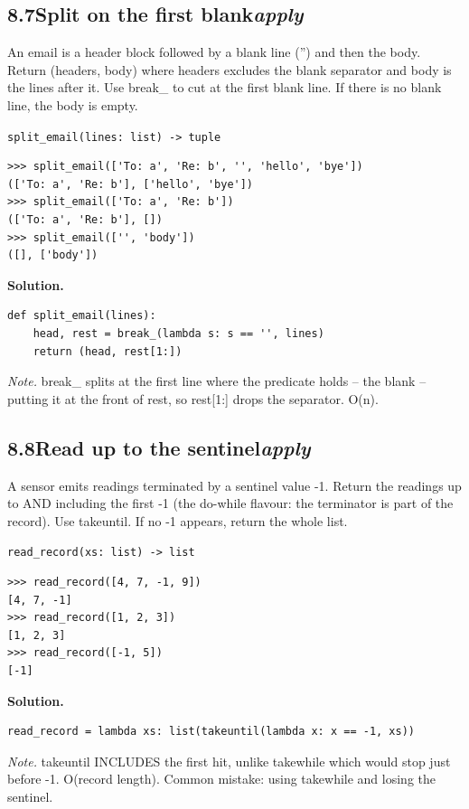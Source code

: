 \documentclass[10pt,letterpaper]{book}
\begin{document}
\subsection*{8.7\quad Split on the first blank\hfill\textnormal{\textit{apply}}}
An email is a header block followed by a blank line ('') and then the body. Return (headers, body) where headers excludes the blank separator and body is the lines after it. Use break\_ to cut at the first blank line. If there is no blank line, the body is empty.

\noindent\texttt{split\_email(lines: list) -> tuple}
\begin{lstlisting}[style=ex]
>>> split_email(['To: a', 'Re: b', '', 'hello', 'bye'])
(['To: a', 'Re: b'], ['hello', 'bye'])
>>> split_email(['To: a', 'Re: b'])
(['To: a', 'Re: b'], [])
>>> split_email(['', 'body'])
([], ['body'])
\end{lstlisting}
\noindent\textbf{Solution.}
\begin{lstlisting}[style=code]
def split_email(lines):
    head, rest = break_(lambda s: s == '', lines)
    return (head, rest[1:])
\end{lstlisting}
\noindent\textit{Note.} break\_ splits at the first line where the predicate holds -- the blank -- putting it at the front of rest, so rest[1:] drops the separator. O(n).


\subsection*{8.8\quad Read up to the sentinel\hfill\textnormal{\textit{apply}}}
A sensor emits readings terminated by a sentinel value -1. Return the readings up to AND including the first -1 (the do-while flavour: the terminator is part of the record). Use takeuntil. If no -1 appears, return the whole list.

\noindent\texttt{read\_record(xs: list) -> list}
\begin{lstlisting}[style=ex]
>>> read_record([4, 7, -1, 9])
[4, 7, -1]
>>> read_record([1, 2, 3])
[1, 2, 3]
>>> read_record([-1, 5])
[-1]
\end{lstlisting}
\noindent\textbf{Solution.}
\begin{lstlisting}[style=code]
read_record = lambda xs: list(takeuntil(lambda x: x == -1, xs))
\end{lstlisting}
\noindent\textit{Note.} takeuntil INCLUDES the first hit, unlike takewhile which would stop just before -1. O(record length). Common mistake: using takewhile and losing the sentinel.
\end{document}
